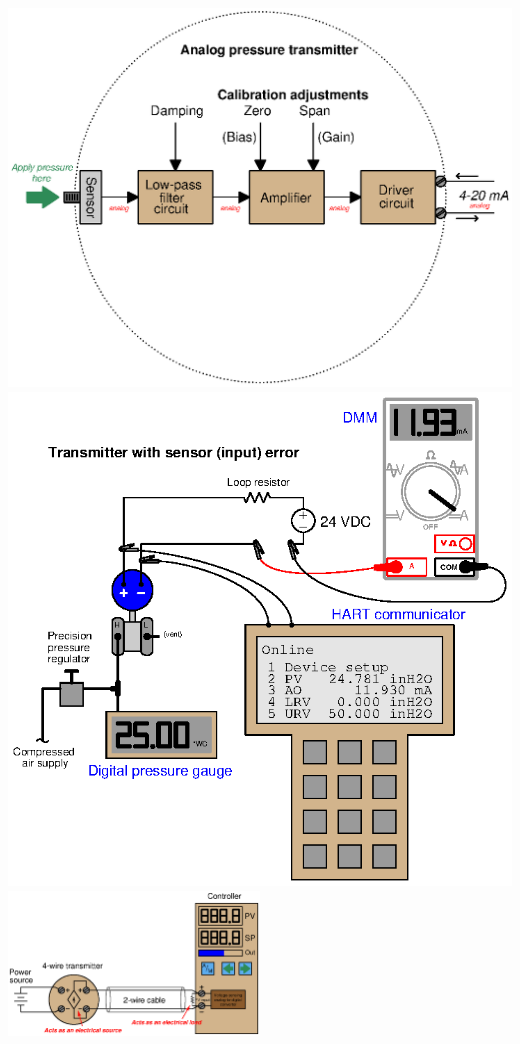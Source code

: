 \documentclass[10pt,a5paper]{article}
\begin{document}
\includegraphics[width=1\textwidth]{calibrate04.eps}
\includegraphics[width=1\textwidth]{calibrate26.eps}
\includegraphics[width=0.5\textwidth]{current09.eps}
\end{document}
